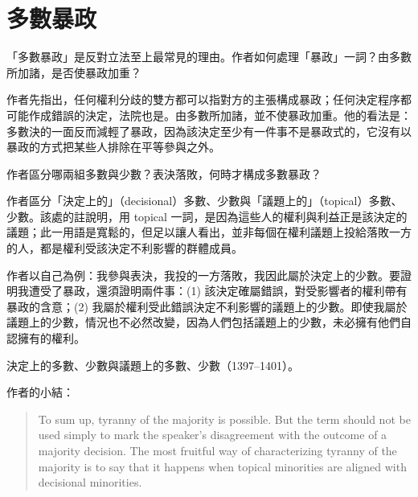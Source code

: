 \chapter{多數暴政}


\begin{qaquestion}
「多數暴政」是反對立法至上最常見的理由。作者如何處理「暴政」一詞？由多數所加諸，是否使暴政加重？
\end{qaquestion}

作者先指出，任何權利分歧的雙方都可以指對方的主張構成暴政；任何決定程序都可能作成錯誤的決定，法院也是。由多數所加諸，並不使暴政加重。他的看法是：多數決的一面反而減輕了暴政，因為該決定至少有一件事不是暴政式的，它沒有以暴政的方式把某些人排除在平等參與之外。


\begin{qaquestion}
作者區分哪兩組多數與少數？表決落敗，何時才構成多數暴政？
\end{qaquestion}

作者區分「決定上的」（decisional）多數、少數與「議題上的」（topical）多數、少數。該處的註說明，用 topical 一詞，是因為這些人的權利與利益正是該決定的議題；此一用語是寬鬆的，但足以讓人看出，並非每個在權利議題上投給落敗一方的人，都是權利受該決定不利影響的群體成員。

作者以自己為例：我參與表決，我投的一方落敗，我因此屬於決定上的少數。要證明我遭受了暴政，還須證明兩件事：(1) 該決定確屬錯誤，對受影響者的權利帶有暴政的含意；(2) 我屬於權利受此錯誤決定不利影響的議題上的少數。即使我屬於議題上的少數，情況也不必然改變，因為人們包括議題上的少數，未必擁有他們自認擁有的權利。

\begin{qafigure}{決定上的多數、少數與議題上的多數、少數（1397--1401）。\label{fig:majorities}}

\end{qafigure}

作者的小結：

\begin{quote}
To sum up, tyranny of the majority is possible. But the term should not be used simply to mark the speaker's disagreement with the outcome of a majority decision. The most fruitful way of characterizing tyranny of the majority is to say that it happens when topical minorities are aligned with decisional minorities.
\end{quote}

